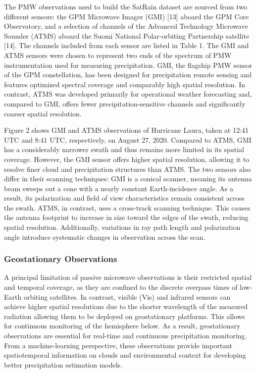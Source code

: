 \documentclass[11pt]{article}
\begin{document}
The PMW observations used to build the SatRain dataset are sourced from two
different sensors: the GPM Microwave Imager (GMI) [13] aboard the GPM Core
Observatory, and a selection of channels of the Advanced Technology Microwave
Sounder (ATMS) aboard the Suomi National Polar-orbiting Partnership satellite
[14]. The channels included from each sensor are listed in Table 1. The GMI and
ATMS sensors were chosen to represent two ends of the spectrum of PMW
instrumentation used for measuring precipitation. GMI, the flagship PMW sensor
of the GPM constellation, has been designed for precipitation remote sensing and
features optimized spectral coverage and comparably high spatial resolution. In
contrast, ATMS was developed primarily for operational weather forecasting and,
compared to GMI, offers fewer precipitation-sensitive channels and significantly
coarser spatial resolution.

Figure 2 shows GMI and ATMS observations of Hurricane Laura, taken at 12:41 UTC
and 8:41 UTC, respectively, on August 27, 2020. Compared to ATMS, GMI has a
considerably narrower swath and thus remains more limited in its spatial
coverage. However, the GMI sensor offers higher spatial resolution, allowing it
to resolve finer cloud and precipitation structures than ATMS. The two sensors
also differ in their scanning techniques: GMI is a conical scanner, meaning its
antenna beam sweeps out a cone with a nearly constant Earth-incidence angle. As
a result, its polarization and field of view characteristics remain consistent
across the swath. ATMS, in contrast, uses a cross-track scanning technique. This
causes the antenna footprint to increase in size toward the edges of the swath,
reducing spatial resolution. Additionally, variations in ray path length and
polarization angle introduce systematic changes in observation across the scan.

\subsubsection{Geostationary Observations}

A principal limitation of passive microwave observations is their restricted
spatial and temporal coverage, as they are confined to the discrete overpass
times of low-Earth orbiting satellites. In contrast, visible (Vis) and infrared
sensors can achieve higher spatial resolutions due to the shorter wavelength of
the measured radiation allowing them to be deployed on geostationary platforms.
This allows for continuous monitoring of the hemisphere below. As a result,
geostationary observations are essential for real-time and continuous
precipitation monitoring. From a machine-learning perspective, these
observations provide important spatiotemporal information on clouds and
environmental context for developing better precipitation estimation models.
\end{document}
